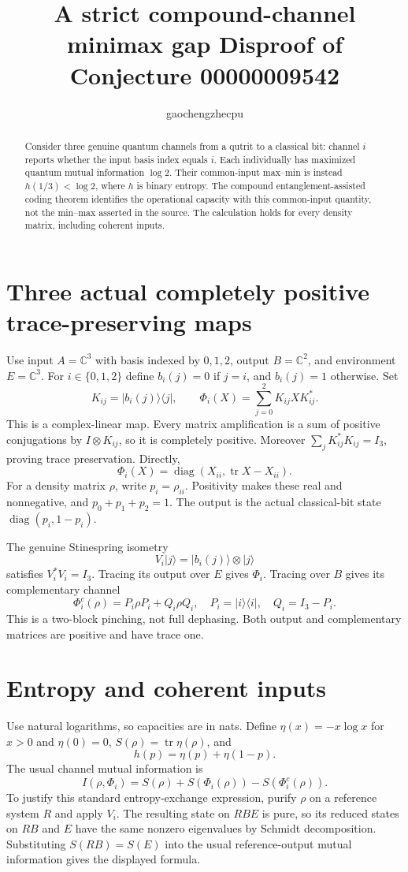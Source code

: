 \documentclass[11pt]{article}
\title{A strict compound-channel minimax gap\newline
\large Disproof of Conjecture 00000009542}
\author{gaochengzhecpu}\date{}
\begin{document}
\maketitle
\begin{abstract}
Consider three genuine quantum channels from a qutrit
to a classical bit: channel $i$ reports whether the
input basis index equals $i$. Each individually has
maximized quantum mutual information $\log2$.
Their common-input max--min is instead $h(1/3)<\log2$,
where $h$ is binary entropy. The compound
entanglement-assisted coding theorem identifies the
operational capacity with this common-input quantity,
not the min--max asserted in the source. The calculation
holds for every density matrix, including coherent inputs.
\end{abstract}

\section*{Three actual completely positive trace-preserving maps}
Use input $A=\mathbb C^3$ with basis indexed by $0,1,2$,
output $B=\mathbb C^2$, and environment $E=\mathbb C^3$.
For $i\in\{0,1,2\}$ define $b_i(j)=0$ if $j=i$,
and $b_i(j)=1$ otherwise. Set
\[
 K_{ij}=|b_i(j)\rangle\langle j|,
 \qquad \Phi_i(X)=\sum_{j=0}^2 K_{ij}XK_{ij}^*.
\]
This is a complex-linear map. Every matrix amplification
is a sum of positive conjugations by $I\otimes K_{ij}$,
so it is completely positive. Moreover
$\sum_jK_{ij}^*K_{ij}=I_3$, proving trace preservation.
Directly,
\[
           \Phi_i(X)=\operatorname{diag}
                         (X_{ii},\operatorname{tr}X-X_{ii}).
\]
For a density matrix $\rho$, write $p_i=\rho_{ii}$.
Positivity makes these real and nonnegative, and
$p_0+p_1+p_2=1$. The output is the actual classical-bit
state $\operatorname{diag}(p_i,1-p_i)$.

The genuine Stinespring isometry
\[
                  V_i|j\rangle=|b_i(j)\rangle\otimes|j\rangle
\]
satisfies $V_i^*V_i=I_3$. Tracing its output over $E$
gives $\Phi_i$. Tracing over $B$ gives its complementary
channel
\[
       \Phi_i^c(\rho)=P_i\rho P_i+Q_i\rho Q_i,
       \quad P_i=|i\rangle\langle i|,\quad Q_i=I_3-P_i.
\]
This is a two-block pinching, not full dephasing.
Both output and complementary matrices are positive
and have trace one.

\newpage
\section*{Entropy and coherent inputs}
Use natural logarithms, so capacities are in nats.
Define $\eta(x)=-x\log x$ for $x>0$ and $\eta(0)=0$,
$S(\rho)=\operatorname{tr}\eta(\rho)$, and
\[
                    h(p)=\eta(p)+\eta(1-p).
\]
The usual channel mutual information is
\[
 I(\rho,\Phi_i)=S(\rho)+S(\Phi_i(\rho))-S(\Phi_i^c(\rho)).
\]
To justify this standard entropy-exchange expression,
purify $\rho$ on a reference system $R$ and apply $V_i$.
The resulting state on $RBE$ is pure, so its reduced
states on $RB$ and $E$ have the same nonzero eigenvalues
by Schmidt decomposition. Substituting
$S(RB)=S(E)$ into the usual reference-output mutual
information gives the displayed formula.
\end{document}
